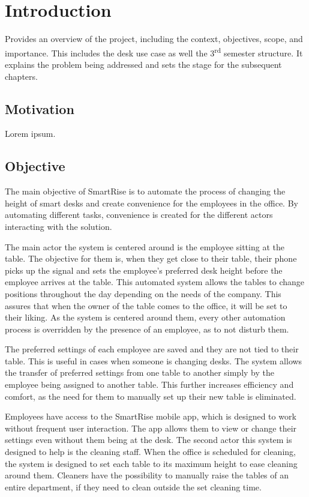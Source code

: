 \chapter{Introduction}

Provides an overview of the project, including the context, objectives, scope, and importance. This includes the desk use case as well the 3\textsuperscript{rd} semester structure. It explains the problem being addressed and sets the stage for the subsequent chapters. 

\section{Motivation} Lorem ipsum.

\section{Objective} The main objective of SmartRise is to automate the process of changing the height of smart desks and create convenience for the employees in the office. By automating different tasks, convenience is created for the different actors interacting with the solution.\par
The main actor the system is centered around is the employee sitting at the table. The objective for them is, when they get close to their table, their phone picks up the signal and sets the employee's preferred desk height before the employee arrives at the table. This automated system allows the tables to change positions throughout the day depending on the needs of the company. This assures that when the owner of the table comes to the office, it will be set to their liking. As the system is centered around them, every other automation process is overridden by the presence of an employee, as to not disturb them.\par
The preferred settings of each employee are saved and they are not tied to their table. This is useful in cases when someone is changing desks. The system allows the transfer of preferred settings from one table to another simply by the employee being assigned to another table. This further increases efficiency and comfort, as the need for them to manually set up their new table is eliminated.\par
Employees have access to the SmartRise mobile app, which is designed to work without frequent user interaction. The app allows them to view or change their settings even without them being at the desk.
The second actor this system is designed to help is the cleaning staff. When the office is scheduled for cleaning, the system is designed to set each table to its maximum height to ease cleaning around them. Cleaners have the possibility to manually raise the tables of an entire department, if they need to clean outside the set cleaning time.\par
